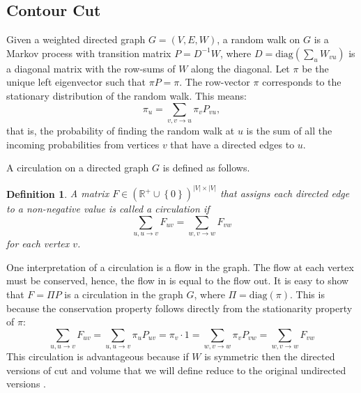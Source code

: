\documentclass{SMBV12}
\newtheorem{definition}{Definition}
\begin{document}
\subsection{Contour Cut}
\label{sec:normalized_cut}
Given a weighted directed graph $G = (V, E, W)$, a random walk on $G$ is a Markov process with transition matrix $P = D^{-1}W$, where $D = \mbox{diag}(\sum_{u}W_{vu})$ is a diagonal matrix with the row-sums of $W$ along the diagonal. Let $\pi$ be the unique left eigenvector such that $\pi P = \pi$. The row-vector $\pi$ corresponds to the stationary distribution of the random walk. This means:
\begin{equation}
\pi_u = \sum\limits_{v, v \rightarrow u} \pi_v P_{vu},
\end{equation}
that is, the probability of finding the random walk at $u$ is the sum of all the incoming probabilities from vertices $v$ that have a directed edges to $u$.

A circulation on a directed graph $G$ is defined as follows.
\begin{definition}
A matrix $F \in (\mathbb{R}^+ \cup \left\lbrace 0 \right\rbrace )^{\lvert V \rvert \times \lvert V \rvert}$ that assigns each directed edge to a non-negative value is called a circulation if
\begin{equation}
\sum\limits_{u, u \rightarrow v} F_{uv} = \sum\limits_{w, v \rightarrow w} F_{vw}
\end{equation}
for each vertex $v$.
\end{definition}
One interpretation of a circulation is a flow in the graph. The flow at each vertex must be conserved, hence, the flow in is equal to the flow out. It is easy to show that $F = \Pi P$ is a circulation in the graph $G$, where $\Pi = \mbox{diag}(\pi)$. This is because the conservation property follows directly from the stationarity property of $\pi$:
\begin{equation}
\sum\limits_{u, u \rightarrow v} F_{uv} = \sum\limits_{u, u \rightarrow v} \pi_u P_{uv} = \pi_v \cdot 1 = \sum\limits_{w, v \rightarrow w} \pi_v P_{vw} = \sum\limits_{w, v \rightarrow w} F_{vw}
\end{equation}
This circulation is advantageous because if $W$ is symmetric then the directed versions of cut and volume that we will define reduce to the original undirected versions \cite{gleich2006hierarchical}.
\end{document}
